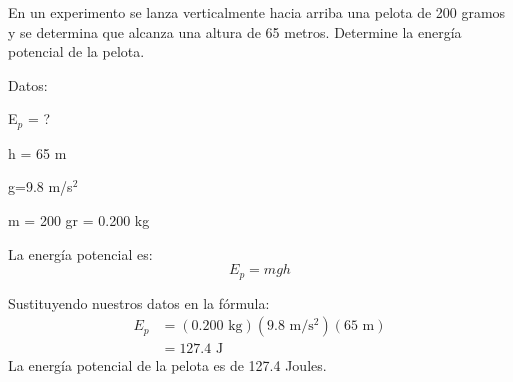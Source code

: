 En un experimento se lanza verticalmente hacia arriba una pelota de 200 gramos y se determina que alcanza una altura de 65 metros. Determine la energía potencial de la pelota.

\begin{solutionbox}{5.5cm}
    \begin{multicols}{2}
        Datos:

        E$_p$ = ?

        h = 65 m

        g=9.8 m/s$^2$

        m = 200 gr = 0.200 kg

        La energía potencial es:
        \[E_p=mgh\]

        \vspace{2cm}

        Sustituyendo nuestros datos en la fórmula:
        \[
            \begin{array}{rl}
                E_p & = (0.200 \text{ kg})(9.8 \text{ m/s$^2$})(65 \text{ m}) \\[1em]
                    & =127.4 \text{ J }
            \end{array}
        \]
        La energía potencial de la pelota es de 127.4 Joules.
    \end{multicols}
\end{solutionbox}
